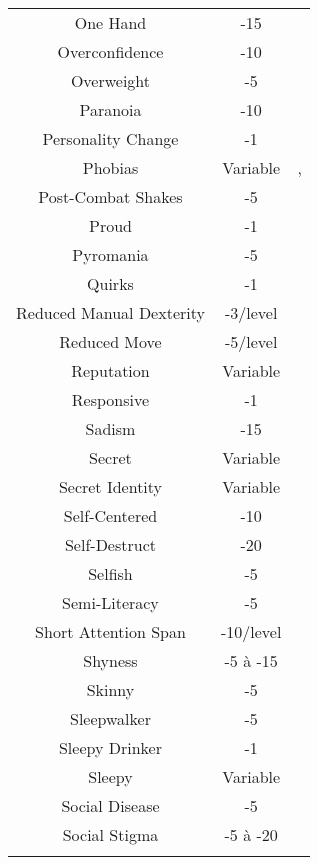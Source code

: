 \begin{center}
\begin{supertabular}{|c|c|c|}
One Hand & -15 & \cite[29]{B} \\
Overconfidence & -10 & \cite[34]{B} \\
Overweight & -5 & \cite[29]{B} \\
Paranoia & -10 & \cite[35]{B} \\
Personality Change & -1 & \cite[80]{CI} \\
Phobias & Variable & \cite[35]{B}, \cite[93]{CI} \\
Post-Combat Shakes & -5 & \cite[93]{CI} \\
Proud & -1 & \cite[93]{CI} \\
Pyromania & -5 & \cite[36]{B} \\
Quirks & -1 & \cite[41]{B} \\
Reduced Manual Dexterity & -3/level & \cite[83]{CI} \\
Reduced Move & -5/level & \cite[103]{CI} \\
Reputation & Variable & \cite[17]{B} \\
Responsive & -1 & \cite[93]{CI} \\
Sadism & -15 & \cite[36]{B} \\
Secret & Variable & \cite[78]{CI} \\
Secret Identity & Variable & \cite[79]{CI} \\
Self-Centered & -10 & \cite[94]{CI} \\
Self-Destruct & -20 & \cite[104]{CI} \\
Selfish & -5 & \cite[94]{CI} \\
Semi-Literacy & -5 & \cite[94]{CI} \\
Short Attention Span & -10/level & \cite[104]{CI} \\
Shyness & -5 à -15 & \cite[37]{B} \\
Skinny & -5 & \cite[29]{B} \\
Sleepwalker & -5 & \cite[84]{CI} \\
Sleepy Drinker & -1 & \cite[80]{CI} \\
Sleepy & Variable & \cite[104]{CI} \\
Social Disease & -5 & \cite[84]{CI} \\
Social Stigma & -5 à -20 & \cite[27]{B} \\

\end{supertabular}
\end{center}
